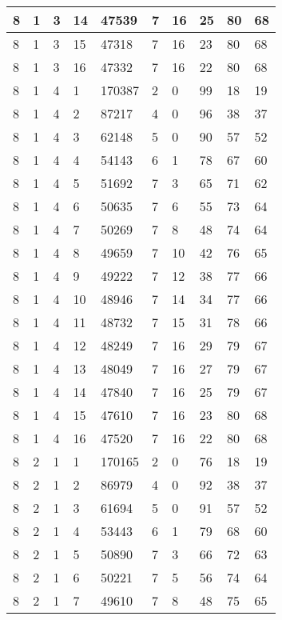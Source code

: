 \begin{table}[!ht]
\begin{tabular}{|l|l|l|l|l|l|l|l|l|l|}
        8 & 1 & 3 & 14 & 47539 & 7 & 16 & 25 & 80 & 68 \\ \hline
        8 & 1 & 3 & 15 & 47318 & 7 & 16 & 23 & 80 & 68 \\ \hline
        8 & 1 & 3 & 16 & 47332 & 7 & 16 & 22 & 80 & 68 \\ \hline
        8 & 1 & 4 & 1 & 170387 & 2 & 0 & 99 & 18 & 19 \\ \hline
        8 & 1 & 4 & 2 & 87217 & 4 & 0 & 96 & 38 & 37 \\ \hline
        8 & 1 & 4 & 3 & 62148 & 5 & 0 & 90 & 57 & 52 \\ \hline
        8 & 1 & 4 & 4 & 54143 & 6 & 1 & 78 & 67 & 60 \\ \hline
        8 & 1 & 4 & 5 & 51692 & 7 & 3 & 65 & 71 & 62 \\ \hline
        8 & 1 & 4 & 6 & 50635 & 7 & 6 & 55 & 73 & 64 \\ \hline
        8 & 1 & 4 & 7 & 50269 & 7 & 8 & 48 & 74 & 64 \\ \hline
        8 & 1 & 4 & 8 & 49659 & 7 & 10 & 42 & 76 & 65 \\ \hline
        8 & 1 & 4 & 9 & 49222 & 7 & 12 & 38 & 77 & 66 \\ \hline
        8 & 1 & 4 & 10 & 48946 & 7 & 14 & 34 & 77 & 66 \\ \hline
        8 & 1 & 4 & 11 & 48732 & 7 & 15 & 31 & 78 & 66 \\ \hline
        8 & 1 & 4 & 12 & 48249 & 7 & 16 & 29 & 79 & 67 \\ \hline
        8 & 1 & 4 & 13 & 48049 & 7 & 16 & 27 & 79 & 67 \\ \hline
        8 & 1 & 4 & 14 & 47840 & 7 & 16 & 25 & 79 & 67 \\ \hline
        8 & 1 & 4 & 15 & 47610 & 7 & 16 & 23 & 80 & 68 \\ \hline
        8 & 1 & 4 & 16 & 47520 & 7 & 16 & 22 & 80 & 68 \\ \hline
        8 & 2 & 1 & 1 & 170165 & 2 & 0 & 76 & 18 & 19 \\ \hline
        8 & 2 & 1 & 2 & 86979 & 4 & 0 & 92 & 38 & 37 \\ \hline
        8 & 2 & 1 & 3 & 61694 & 5 & 0 & 91 & 57 & 52 \\ \hline
        8 & 2 & 1 & 4 & 53443 & 6 & 1 & 79 & 68 & 60 \\ \hline
        8 & 2 & 1 & 5 & 50890 & 7 & 3 & 66 & 72 & 63 \\ \hline
        8 & 2 & 1 & 6 & 50221 & 7 & 5 & 56 & 74 & 64 \\ \hline
        8 & 2 & 1 & 7 & 49610 & 7 & 8 & 48 & 75 & 65 \\ \hline

\end{tabular}
\end{table}
